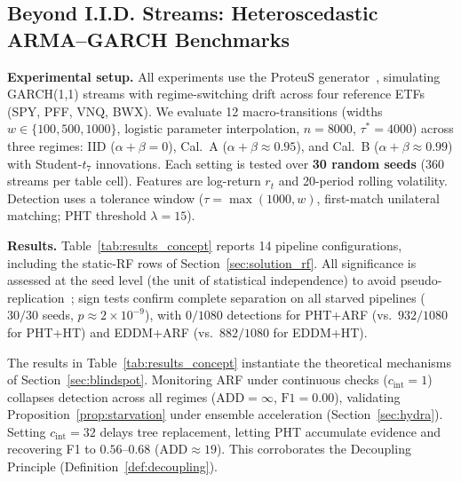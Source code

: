 \documentclass[10pt,conference]{IEEEtran}
\theoremstyle{definition}
\begin{document}
\subsection{Beyond I.I.D. Streams: Heteroscedastic ARMA--GARCH Benchmarks}\label{sec:proteus}

\noindent\textbf{Experimental setup.}
All experiments use the ProteuS generator~\cite{suarez_cetrulo_proteus_2025}, simulating GARCH(1,1) streams with regime-switching drift across four reference ETFs (SPY, PFF, VNQ, BWX).
We evaluate 12 macro-transitions (widths $w \in \{100, 500, 1000\}$, logistic parameter interpolation, $n = 8000$, $\tau^* = 4000$) across three regimes: IID ($\alpha + \beta = 0$), Cal.~A ($\alpha + \beta \approx 0.95$), and Cal.~B ($\alpha + \beta \approx 0.99$) with Student-$t_7$ innovations.
Each setting is tested over \textbf{30 random seeds} (360 streams per table cell).
Features are log-return $r_t$ and 20-period rolling volatility.
Detection uses a tolerance window ($\tau = \max(1000, w)$, first-match unilateral matching; PHT threshold $\lambda = 15$).

\noindent\textbf{Results.}
Table~\ref{tab:results_concept} reports 14 pipeline configurations, including the static-RF rows of Section~\ref{sec:solution_rf}. All significance is assessed at the seed level (the unit of statistical independence) to avoid pseudo-replication~\cite{demsar_statistical_2006}; sign tests confirm complete separation on all starved pipelines ($30/30$ seeds, $p \approx 2 \times 10^{-9}$), with $0/1080$ detections for PHT+ARF (vs.\ $932/1080$ for PHT+HT) and EDDM+ARF (vs.\ $882/1080$ for EDDM+HT).



The results in Table~\ref{tab:results_concept} instantiate the theoretical mechanisms of Section~\ref{sec:blindspot}. Monitoring ARF under continuous checks ($c_{\mathrm{int}}=1$) collapses detection across all regimes ($\mathrm{ADD} = \infty$, $\mathrm{F1} = 0.00$), validating Proposition~\ref{prop:starvation} under ensemble acceleration (Section~\ref{sec:hydra}). Setting $c_{\mathrm{int}}=32$ delays tree replacement, letting PHT accumulate evidence and recovering F1 to $0.56$--$0.68$ ($\mathrm{ADD} \approx 19$). This corroborates the Decoupling Principle (Definition~\ref{def:decoupling}).
\end{document}
